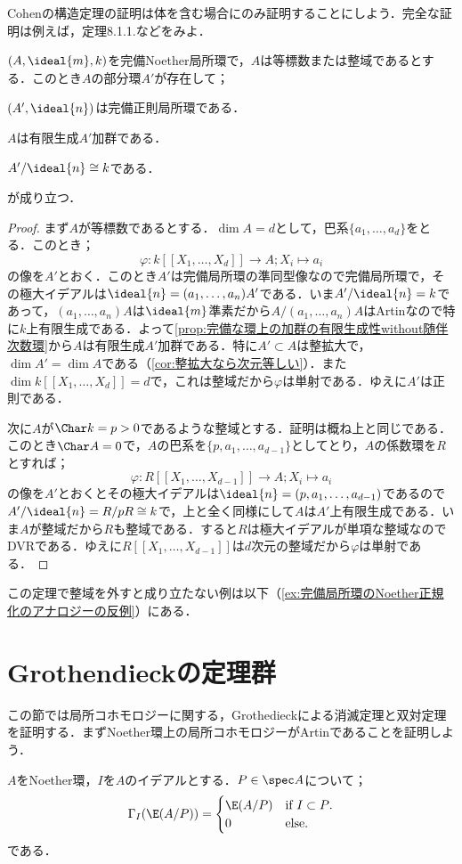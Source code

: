 Cohenの構造定理の証明は体を含む場合にのみ証明することにしよう．完全な証明は例えば\cite{Nagata1974}，定理8.1.1.などをみよ．

\begin{thm}\label{thm:完備正則局所環のNoether正規化}
	$(A,\ideal{m},k)$を完備Noether局所環で，$A$は等標数または整域であるとする．このとき$A$の部分環$A'$が存在して；
	\begin{sakura}
		\item $(A',\ideal{n})$は完備正則局所環である．
		\item $A$は有限生成$A'$加群である．
		\item $A'/\ideal{n}\cong k$である．
	\end{sakura}
	が成り立つ．
\end{thm}

\begin{proof}
	まず$A$が等標数であるとする．$\dim A=d$として，巴系$\{a_1,\dots,a_d\}$をとる．このとき；
	\[\varphi:k[[ X_1,\dots,X_d]] \to A;X_i\mapsto a_i\]
	の像を$A'$とおく．このとき$A'$は完備局所環の準同型像なので完備局所環で，その極大イデアルは$\ideal{n}=(a_1,\dots,a_n)A'$である．いま$A'/\ideal{n}=k$であって，$(a_1,\dots,a_n)A$は$\ideal{m}$準素だから$A/(a_1,\dots,a_n)A$はArtinなので特に$k$上有限生成である．よって\ref{prop:完備な環上の加群の有限生成性without随伴次数環}から$A$は有限生成$A'$加群である．特に$A'\subset A$は整拡大で，$\dim A'=\dim A$である（\ref{cor:整拡大なら次元等しい}）．また$\dim k[[X_1,\dots,X_d]]=d$で，これは整域だから$\varphi$は単射である．ゆえに$A'$は正則である．
	
	次に$A$が$\Char k=p>0$であるような整域とする．証明は概ね上と同じである．このとき$\Char A=0$で，$A$の巴系を$\{p,a_1,\dots,a_{d-1}\}$としてとり，$A$の係数環を$R$とすれば；
	\[\varphi:R[[X_1,\dots,X_{d-1}]]\to A;X_i\mapsto a_i\]
	の像を$A'$とおくとその極大イデアルは$\ideal{n}=(p,a_1,\dots,a_{d-1})$であるので$A'/\ideal{n}=R/pR\cong k$で，上と全く同様にして$A$は$A'$上有限生成である．いま$A$が整域だから$R$も整域である．すると$R$は極大イデアルが単項な整域なのでDVRである．ゆえに$R[[X_1,\dots,X_{d-1}]]$は$d$次元の整域だから$\varphi$は単射である．
\end{proof}

この定理で整域を外すと成り立たない例は以下（\ref{ex:完備局所環のNoether正規化のアナロジーの反例}）にある．
\section{Grothendieckの定理群}

この節では局所コホモロジーに関する，Grothedieckによる消滅定理と双対定理を証明する．まずNoether環上の局所コホモロジーがArtinであることを証明しよう．
\begin{prop}
	$A$をNoether環，$I$を$A$のイデアルとする．$P\in\spec A$について；
	\[\Gamma_I(\E(A/P))=\begin{cases}
		\E(A/P) &\text{if~$I\subset P$.}\\
		0&\text{else.}
	\end{cases}\]
	である．
\end{prop}

